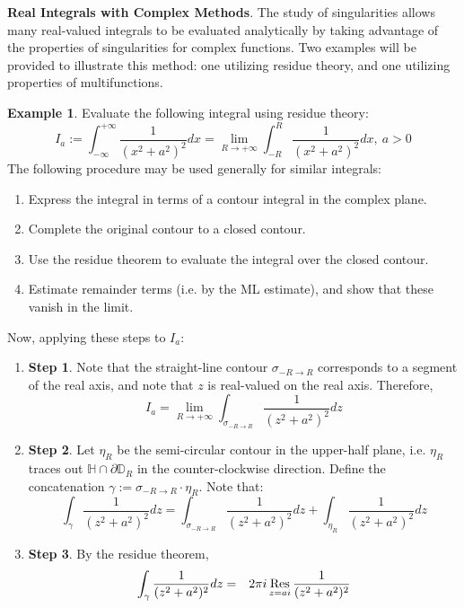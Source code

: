 \begin{framed}
    \textbf{Real Integrals with Complex Methods}. The study of singularities allows many real-valued integrals to be evaluated analytically by taking advantage of the properties of singularities for complex functions. Two examples will be provided to illustrate this method: one utilizing residue theory, and one utilizing properties of multifunctions.

    \textbf{Example 1}. Evaluate the following integral using residue theory: \[I_a := \int_{-\infty}^{+\infty} \frac{1}{(x^2+a^2)^2}dx = \lim_{R\to +\infty} \int_{-R}^R \frac{1}{(x^2+a^2)^2}dx,\ a > 0\] The following procedure may be used generally for similar integrals: \vspace{-1em}\begin{enumerate}
        \item[1.] Express the integral in terms of a contour integral in the complex plane.
        \item[2.] Complete the original contour to a closed contour.
        \item[3.] Use the residue theorem to evaluate the integral over the closed contour.
        \item[4.] Estimate remainder terms (i.e. by the ML estimate), and show that these vanish in the limit.
    \end{enumerate} \vspace{-1em}
    Now, applying these steps to $I_a$: \vspace{-1em} \begin{enumerate}
        \item[] \textbf{Step 1}. Note that the straight-line contour $\sigma_{-R\to R}$ corresponds to a segment of the real axis, and note that $z$ is real-valued on the real axis. Therefore, \[I_a = \lim_{R\to +\infty}\int_{\sigma_{-R\to R}} \frac{1}{(z^2+a^2)^2} dz\]
        \item[] \textbf{Step 2}. Let $\eta_R$ be the semi-circular contour in the upper-half plane, i.e. $\eta_R$ traces out $\mathbb{H}\cap \partial\mathbb{D}_R$ in the counter-clockwise direction. Define the concatenation $\gamma := \sigma_{-R\to R} \cdot \eta_R$. Note that: \[\int_\gamma \frac{1}{(z^2+a^2)^2} dz = \int_{\sigma_{-R\to R}} \frac{1}{(z^2+a^2)^2}dz + \int_{\eta_R} \frac{1}{(z^2+a^2)^2} dz\]
        \item[] \textbf{Step 3}. By the residue theorem, \begin{eqnarray*}
            \int_\gamma \frac{1}{(z^2+a^2)^2}dz &=& 2\pi i \Res_{z= ai} \frac{1}{(z^2+a^2)^2}\\

\end{eqnarray*}
\end{enumerate}
\end{framed}
